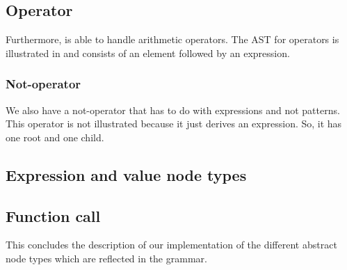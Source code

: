 \subsection{Operator}%

Furthermore, \productname{} is able to handle arithmetic operators. The AST for operators is illustrated in  and consists of an element followed by an expression.%

%

\subsubsection{Not-operator}%

We also have a not-operator that has to do with expressions and not patterns. This operator is not illustrated because it just derives an expression. So, it has one root and one child.


\subsection{Expression and value node types}


%
%
%
%
%
%
%


\subsection{Function call}

%

This concludes the description of our implementation of the different abstract node types which are reflected in the grammar.